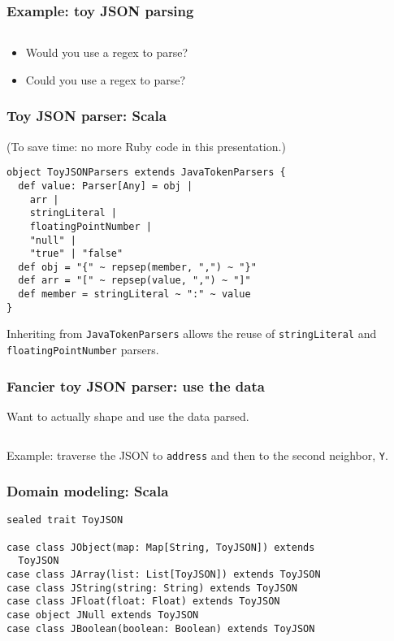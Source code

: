 
\begin{frame}[fragile]
  \frametitle{Example: toy JSON parsing}

  \inputminted{json}{javascript/example.json}

  \begin{itemize}
    \item Would you use a regex to parse?
    \item Could you use a regex to parse?
  \end{itemize}
\end{frame}

%

\begin{frame}[fragile]
  \frametitle{Toy JSON parser: Scala}

  (To save time: no more Ruby code in this presentation.)

  \begin{verbatim}
object ToyJSONParsers extends JavaTokenParsers {
  def value: Parser[Any] = obj |
    arr |
    stringLiteral |
    floatingPointNumber |
    "null" |
    "true" | "false"
  def obj = "{" ~ repsep(member, ",") ~ "}"
  def arr = "[" ~ repsep(value, ",") ~ "]"
  def member = stringLiteral ~ ":" ~ value
}
  \end{verbatim}

  Inheriting from \texttt{JavaTokenParsers} allows the reuse of \texttt{stringLiteral} and \texttt{floatingPointNumber} parsers.
\end{frame}

\begin{frame}[fragile]
  \frametitle{Fancier toy JSON parser: use the data}

  Want to actually shape and use the data parsed.

  \inputminted{json}{javascript/example.json}
  
  Example: traverse the JSON to \texttt{address} and then to the second neighbor, \texttt{Y}.
\end{frame}

\begin{frame}[fragile]
  \frametitle{Domain modeling: Scala}

  \begin{verbatim}
sealed trait ToyJSON

case class JObject(map: Map[String, ToyJSON]) extends
  ToyJSON
case class JArray(list: List[ToyJSON]) extends ToyJSON
case class JString(string: String) extends ToyJSON
case class JFloat(float: Float) extends ToyJSON
case object JNull extends ToyJSON
case class JBoolean(boolean: Boolean) extends ToyJSON
  \end{verbatim}
\end{frame}

